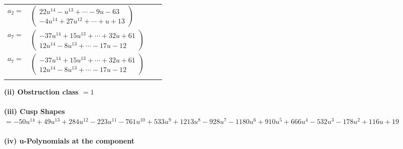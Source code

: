 \documentclass[1p]{elsarticle_modified}
\theoremstyle{definition}
\begin{document}
\begin{tabular}{m{7pt} m{180pt} m{7pt} m{180pt} }
\flushright $a_{2}=$&$\begin{pmatrix}22 u^{14}- u^{13}+\cdots-9 u-63\\-4 u^{14}+27 u^{12}+\cdots+u+13\end{pmatrix}$ \\
\flushright $a_{7}=$&$\begin{pmatrix}-37 u^{14}+15 u^{13}+\cdots+32 u+61\\12 u^{14}-8 u^{13}+\cdots-17 u-12\end{pmatrix}$\\ \flushright $a_{7}=$&$\begin{pmatrix}-37 u^{14}+15 u^{13}+\cdots+32 u+61\\12 u^{14}-8 u^{13}+\cdots-17 u-12\end{pmatrix}$\\&\end{tabular}
\flushleft \textbf{(ii) Obstruction class $= 1$}\\~\\
\flushleft \textbf{(iii) Cusp Shapes $= -50 u^{14}+49 u^{13}+284 u^{12}-223 u^{11}-761 u^{10}+533 u^9+1213 u^8-928 u^7-1180 u^6+910 u^5+666 u^4-532 u^3-178 u^2+116 u+19$}\\~\\
\newpage\renewcommand{\arraystretch}{1}
\flushleft \textbf{(iv) u-Polynomials at the component}\newline \\
\end{document}
